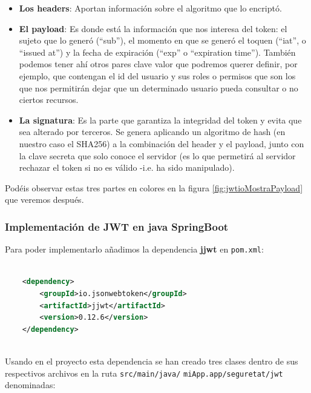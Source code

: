 \documentclass[a4paper,12pt]{report}
\begin{document}
				\begin{itemize}
					\setlength{\itemsep}{-.5em}
					\item 				\textbf{Los headers}: Aportan información sobre el algoritmo que lo encriptó.
					\item 				\textbf{El payload}: Es donde está la información que nos interesa del token: el sujeto que lo generó (``sub''), el momento en que se generó el toquen (``iat'', o ``issued at'') y la fecha de expiración (``exp'' o ``expiration time''). También podemos tener ahí otros pares clave valor que podremos querer definir, por ejemplo, que contengan el id del usuario y sus roles o permisos que son los que nos permitirán dejar que un determinado usuario pueda consultar o no ciertos recursos.
					
					\item \textbf{La signatura}: Es la parte que garantiza la integridad del token y evita que sea alterado por terceros. Se genera aplicando un algoritmo de hash (en nuestro caso el SHA256) a la combinación del header y el payload, junto con la clave secreta que solo conoce el servidor (es lo que permetirá al servidor rechazar el token si no es válido -i.e. ha sido manipulado).
				\end{itemize}
				
				Podéis observar estas tres partes en colores en la figura \ref{fig:jwtioMostraPayload} que veremos después.
				
				
				

				

				
				
				\subsubsection{Implementación de JWT en java SpringBoot}
				\label{sec:implementacionJWTjava}
				Para poder implementarlo añadimos la dependencia \textbf{jjwt} en \texttt{pom.xml}:
				
				
				\begin{lstlisting}[language=XML, basicstyle=\ttfamily\small, keywordstyle=\color{red}]
					
	<dependency>
		<groupId>io.jsonwebtoken</groupId>
		<artifactId>jjwt</artifactId>
		<version>0.12.6</version>
	</dependency>
					
				\end{lstlisting}
				
				
		Usando en el proyecto esta dependencia se han creado tres clases dentro de sus respectivos archivos en la ruta \texttt{src/main/java/} \texttt{miApp.app/seguretat/jwt} denominadas:
		
\end{document}
